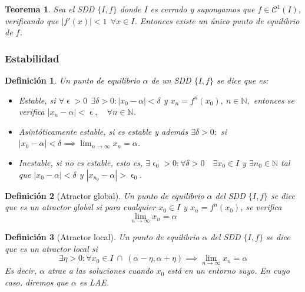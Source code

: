 \documentclass[11pt, a4paper, titlepage]{article}
\let\epsilon\upvarepsilon
\theoremstyle{theorem-style}
\newtheorem*{nth}{Teorema}
\theoremstyle{definition-style}
\newtheorem*{ndef}{Definición}
\theoremstyle{remark-style}
\theoremstyle{example-style}
\begin{document}
\begin{nth}
	Sea el SDD $\{I,f\}$ donde $I$ es cerrado y supongamos que $f\in \mathcal{C}^1(I)$, verificando que $|f'(x)|< 1 \ \ \forall x \in I$. Entonces existe un único punto de equilibrio de $f$.
\end{nth}

\subsubsection{Estabilidad}
\begin{ndef}
	Un punto de equilibrio $\alpha$ de un SDD $\{I,f\}$ se dice que es:
	\begin{itemize}
	\item Estable, si $\forall \epsilon > 0 \ \ \exists \delta > 0 : |x_0 - \alpha| < \delta$ y $x_n = f^n(x_0),\ n \in \mathbb{N},$ entonces se verifica $|x_n - \alpha| < \epsilon, \quad \forall n \in \mathbb{N}$.
	\item Asintóticamente estable, si es estable y además $\exists \delta > 0 :$ si $|x_0 - \alpha| < \delta \implies \lim_{n\to \infty}x_n = \alpha$.
	\item Inestable, si no es estable, esto es, $\exists \epsilon_0 > 0 : \forall \delta > 0\quad \exists x_0 \in I$ y $\exists n_0 \in \mathbb{N}$ tal que $|x_0 - \alpha| < \delta$ y $|x_{n_0} - \alpha| > \epsilon_0$.
\end{itemize}
\end{ndef}

\begin{ndef}[Atractor global]
	Un punto de equilibrio $\alpha$ del SDD $\{I,f\}$ se dice que es un atractor global si para cualquier $x_0 \in I$ y $x_n=f^n(x_0)$, se verifica $$\lim_{n \rightarrow \infty} x_n = \alpha$$
\end{ndef}	

\begin{ndef}[Atractor local]
	Un punto de equilibrio $\alpha$ del SDD $\{I,f\}$ se dice que es un atractor local si 
$$\exists \eta > 0 : \forall x_0 \in I\ \cap\ (\alpha-\eta, \alpha+\eta) \implies \lim_{n \rightarrow \infty}x_n=\alpha$$
Es decir, $\alpha$ atrae a las soluciones cuando $x_0$ está en un entorno suyo. En cuyo caso, diremos que $\alpha$ es LAE.
\end{ndef}
\end{document}
